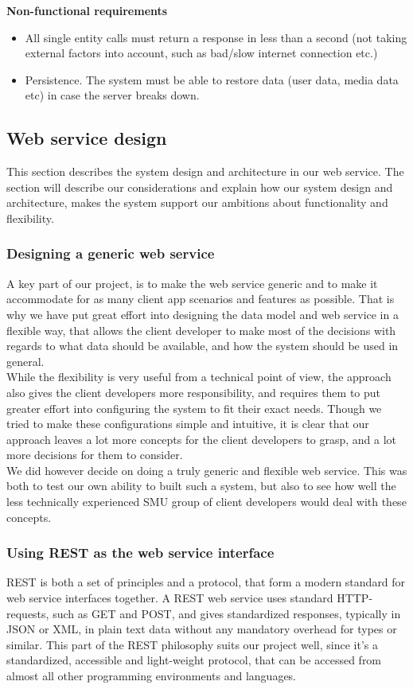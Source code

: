 \documentclass[10pt,a4paper]{article}
\begin{document}
\textbf{Non-functional requirements}
\begin{itemize}
	\item All single entity calls must return a response in less than a second (not taking external factors into account, such as bad/slow internet connection etc.)
	\item Persistence. The system must be able to restore data (user data, media data etc) in case the server breaks down.
\end{itemize}

\subsection{Web service design}
This section describes the system design and architecture in our web service. The section will describe our considerations and explain how our system design and architecture, makes the system support our ambitions about functionality and flexibility.

\subsubsection{Designing a generic web service}
A key part of our project, is to make the web service generic and to make it accommodate for as many client app scenarios and features as possible. That is why we have put great effort into designing the data model and web service in a flexible way, that allows the client developer to make most of the decisions with regards to what data should be available, and how the system should be used in general. \\

While the flexibility is very useful from a technical point of view, the approach also gives the client developers more responsibility, and requires them to put greater effort into configuring the system to fit their exact needs. Though we tried to make these configurations simple and intuitive, it is clear that our approach leaves a lot more concepts for the client developers to grasp, and a lot more decisions for them to consider. \\

We did however decide on doing a truly generic and flexible web service. This was both to test our own ability to built such a system, but also to see how well the less technically experienced SMU group of client developers would deal with these concepts.

\subsubsection{Using REST as the web service interface}
REST is both a set of principles and a protocol, that form a modern standard for web service interfaces together. A REST web service uses standard HTTP-requests, such as GET and POST, and gives standardized responses, typically in JSON or XML, in plain text data without any mandatory overhead for types or similar. This part of the REST philosophy suits our project well, since it's a standardized, accessible and light-weight protocol, that can be accessed from almost all other programming environments and languages. \\
\end{document}
